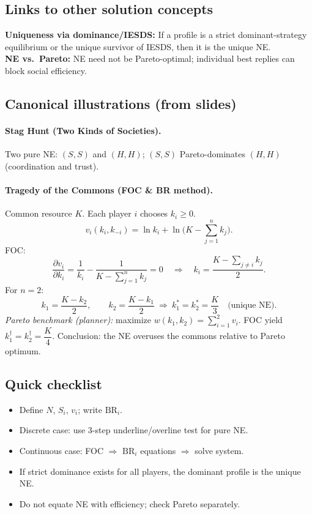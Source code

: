 \documentclass[10pt]{article}
\newcommand{\br}{\mathrm{BR}}
\begin{document}
\subsection*{Links to other solution concepts}
\textbf{Uniqueness via dominance/IESDS:} If a profile is a strict dominant-strategy equilibrium or the unique survivor of IESDS, then it is the unique NE. \\
\textbf{NE vs.\ Pareto:} NE need not be Pareto-optimal; individual best replies can block social efficiency.

\subsection*{Canonical illustrations (from slides)}
\paragraph{Stag Hunt (Two Kinds of Societies).} Two pure NE: $(S,S)$ and $(H,H)$; $(S,S)$ Pareto-dominates $(H,H)$ (coordination and trust).

\paragraph{Tragedy of the Commons (FOC \& BR method).}
Common resource $K$. Each player $i$ chooses $k_i\ge 0$.
\[
v_i(k_i,k_{-i})=\ln k_i+\ln\!\Big(K-\sum_{j=1}^n k_j\Big).
\]
FOC:
\[
\frac{\partial v_i}{\partial k_i}=\frac{1}{k_i}-\frac{1}{K-\sum_{j=1}^n k_j}=0
\quad\Longrightarrow\quad
k_i=\frac{K-\sum_{j\ne i}k_j}{2}.
\]
For $n=2$:
\[
k_1=\frac{K-k_2}{2},\qquad k_2=\frac{K-k_1}{2}
\ \Longrightarrow\ 
k_1^*=k_2^*=\frac{K}{3}\quad\text{(unique NE)}.
\]
\emph{Pareto benchmark (planner):} maximize $w(k_1,k_2)=\sum_{i=1}^2 v_i$.
FOC yield $k_1^\dagger=k_2^\dagger=\dfrac{K}{4}$.
Conclusion: the NE overuses the commons relative to Pareto optimum.

\subsection*{Quick checklist}
\begin{itemize}
\item Define $N$, $S_i$, $v_i$; write $\br_i$.
\item Discrete case: use 3-step underline/overline test for pure NE.
\item Continuous case: FOC $\Rightarrow$ $\br_i$ equations $\Rightarrow$ solve system.
\item If strict dominance exists for all players, the dominant profile is the unique NE.
\item Do not equate NE with efficiency; check Pareto separately.
\end{itemize}
\end{document}
